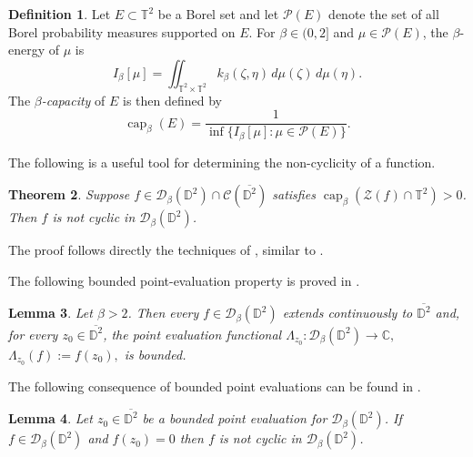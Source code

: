 \documentclass[a4paper,12pt]{amsart}
\newtheorem{thm}{Theorem}[section]
\newtheorem{lem}[thm]{Lemma}
\theoremstyle{definition}
\newtheorem{defn}[thm]{Definition}
\def\D{\mathbb D}
\begin{document}
\begin{defn}
Let $E \subset  \mathbb{T}^2$ be a Borel set and let $\mathcal P(E)$ denote the set of all
Borel probability measures supported on $E$.  
For $\beta \in (0,2]$ and $\mu \in \mathcal P(E)$, the $\beta$-energy of $\mu$ is
\begin{equation*}
    I_{\beta}[\mu]
    =
    \iint_{\mathbb{T}^2 \times \mathbb{T}^2} k_{\beta}\!\left( \zeta,\eta \right)
    \, d\mu(\zeta)\, d\mu(\eta).
\end{equation*}
The \emph{$\beta$-capacity} of $E$ is then defined by
\begin{equation*}    
    \operatorname{cap}_{\beta}(E)
    =
    \frac{1}{\inf \{ I_{\beta}[\mu] : \mu \in \mathcal P(E) \}}.
\end{equation*}
\end{defn}
The following is a useful tool for determining the non-cyclicity of a function.

\begin{thm} \label{thm:cap_noncyclic}
    Suppose $f \in \mathcal D_{\beta}(\D^2) \cap \mathcal{C} (\overline{\D^2})$ satisfies $\operatorname{cap}_{\beta}(\mathcal{Z}(f) \cap \mathbb{T}^2) > 0$. 
    Then $f$ is not cyclic in $\mathcal D_\beta(\D^2)$.
\end{thm}

The proof follows directly the techniques of \cite{BS84}, similar to \cite{Knese2019_Aniso_Bidisk}.

The following bounded point-evaluation property is proved in
\cite[Proposition~34, p.~14]{Pouriya_FirstPaper}.
\begin{lem}\label{lem:bounded-point-evaluations}
Let $\beta>2$. Then every $f\in \mathcal D_\beta(\mathbb D^2)$ extends
continuously to $\overline{\mathbb D^2}$ and, for every
$z_0\in\overline{\mathbb D^2}$, the point evaluation functional
$\Lambda_{z_0}:\mathcal D_\beta(\mathbb D^2)\longrightarrow\mathbb C,$ $\Lambda_{z_0}(f):=f(z_0),$
is bounded.
\end{lem}

The following consequence of bounded point evaluations can be found in
\cite[Theorem~14 and Remark~15, p.~7]{Pouriya_FirstPaper}.
\begin{lem}\label{lem:zero-at-bounded-point-evaluation}
Let $z_0\in\overline{\mathbb D^2}$ be a bounded point evaluation for
$\mathcal D_\beta(\mathbb D^2)$. If $f\in \mathcal D_\beta(\mathbb D^2)$ and $f(z_0)=0$
then $f$ is not cyclic in $\mathcal D_\beta(\mathbb D^2)$.
\end{lem}
\end{document}
